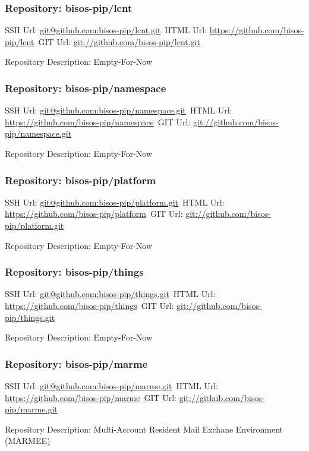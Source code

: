 \subsubsection{Repository: bisos-pip/lcnt}

SSH Url:  \url{git@github.com:bisos-pip/lcnt.git}\
HTML Url: \url{https://github.com/bisos-pip/lcnt}\
GIT Url:  \url{git://github.com/bisos-pip/lcnt.git}

Repository Description: Empty-For-Now

\subsubsection{Repository: bisos-pip/namespace}

SSH Url:  \url{git@github.com:bisos-pip/namespace.git}\
HTML Url: \url{https://github.com/bisos-pip/namespace}\
GIT Url:  \url{git://github.com/bisos-pip/namespace.git}

Repository Description: Empty-For-Now

\subsubsection{Repository: bisos-pip/platform}

SSH Url:  \url{git@github.com:bisos-pip/platform.git}\
HTML Url: \url{https://github.com/bisos-pip/platform}\
GIT Url:  \url{git://github.com/bisos-pip/platform.git}

Repository Description: Empty-For-Now

\subsubsection{Repository: bisos-pip/things}

SSH Url:  \url{git@github.com:bisos-pip/things.git}\
HTML Url: \url{https://github.com/bisos-pip/things}\
GIT Url:  \url{git://github.com/bisos-pip/things.git}

Repository Description: Empty-For-Now

\subsubsection{Repository: bisos-pip/marme}

SSH Url:  \url{git@github.com:bisos-pip/marme.git}\
HTML Url: \url{https://github.com/bisos-pip/marme}\
GIT Url:  \url{git://github.com/bisos-pip/marme.git}

Repository Description: Multi-Account Resident Mail Exchane Environment (MARMEE)

